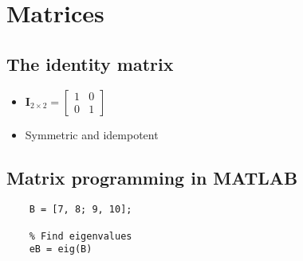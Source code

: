 \documentclass{article}
\begin{document}
\section{Matrices}
\subsection{ The identity matrix}
\begin{itemize}
\item $ \mathbf{I}_{2 \times 2} = \left[
    \begin{array}{cc}
     1 & 0 \\
     0 & 1
    \end{array} \right] $
\item Symmetric and idempotent
\end{itemize}
\subsection{Matrix programming in MATLAB}
\begin{verbatim}
    B = [7, 8; 9, 10];
    
    % Find eigenvalues
    eB = eig(B)
\end{verbatim}
\end{document}
